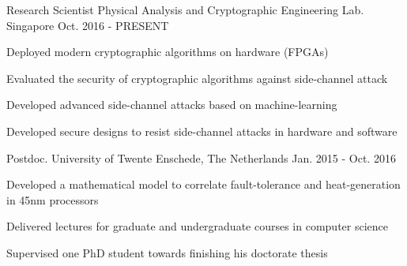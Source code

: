 

\begin{cventries}

  \cventry
    {Research Scientist} %
    {Physical Analysis and Cryptographic Engineering Lab.} %
    {Singapore} %
    {Oct. 2016 - PRESENT} %
    {
      \begin{cvitems} %
	\item {Deployed modern cryptographic algorithms on hardware (FPGAs)}
        \item {Evaluated the security of cryptographic algorithms against side-channel attack}
        \item {Developed advanced side-channel attacks based on machine-learning}
        \item {Developed secure designs to resist side-channel attacks in hardware and software}
      \end{cvitems}
    }

  \cventry
    {Postdoc.} %
    {University of Twente} %
    {Enschede, The Netherlands} %
    {Jan. 2015 - Oct. 2016} %
    {
      \begin{cvitems} %
        \item {Developed a mathematical model to correlate fault-tolerance and heat-generation in 45nm processors}
        \item {Delivered lectures for graduate and undergraduate courses in computer science}
	\item {Supervised one PhD student towards finishing his doctorate thesis}
      \end{cvitems}
    }


\end{cventries}

